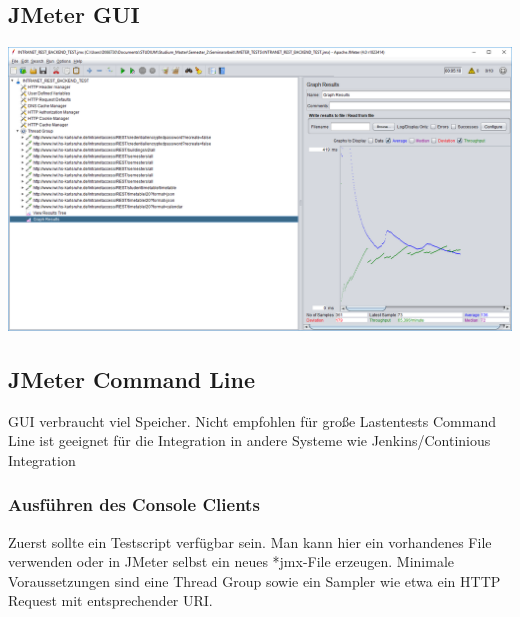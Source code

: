\documentclass[a4paper,12pt]{article}
\begin{document}
\subsection{JMeter GUI}
\includegraphics[width=1\textwidth]{bilder/jmeter_2.png}\par\vspace{1cm}

\subsection{JMeter Command Line}
\label{chap:jmeter_commandline}
GUI verbraucht viel Speicher. Nicht empfohlen für große Lastentests
Command Line ist geeignet für die Integration in andere Systeme wie Jenkins/Continious Integration
\subsubsection{Ausführen des Console Clients}
Zuerst sollte ein Testscript verfügbar sein. Man kann hier ein vorhandenes File verwenden oder in JMeter selbst ein neues *jmx-File erzeugen. Minimale Voraussetzungen sind eine Thread Group sowie ein Sampler wie etwa ein HTTP Request mit entsprechender URI.
\end{document}
